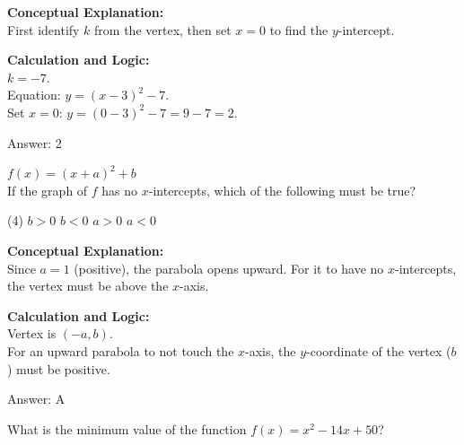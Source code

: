 \documentclass[11pt,paper=a4,answers]{exam}
\begin{document}
\begin{questions}
\begin{solution}
\textbf{Conceptual Explanation:} \\
First identify $k$ from the vertex, then set $x=0$ to find the $y$-intercept.

\vspace{20pt}

\textbf{Calculation and Logic:} \\
$k = -7$. \\
Equation: $y = (x-3)^2 - 7$. \\
Set $x = 0$: $y = (0-3)^2 - 7 = 9 - 7 = 2$.

\vspace{25pt}

Answer: \colorbox{yellow!100}{2}
\end{solution}

\vspace{40pt}

\question
$f(x) = (x+a)^2 + b$ \\
If the graph of $f$ has no $x$-intercepts, which of the following must be true?
\begin{tasks}(4)
    \task $b > 0$
    \task $b < 0$
    \task $a > 0$
    \task $a < 0$
\end{tasks}

\begin{solution}
\textbf{Conceptual Explanation:} \\
Since $a=1$ (positive), the parabola opens upward. For it to have no $x$-intercepts, the vertex must be above the $x$-axis.

\vspace{20pt}

\textbf{Calculation and Logic:} \\
Vertex is $(-a, b)$. \\
For an upward parabola to not touch the $x$-axis, the $y$-coordinate of the vertex ($b$) must be positive.

\vspace{25pt}

Answer: \colorbox{yellow!100}{A}
\end{solution}

\vspace{40pt}

\question
What is the minimum value of the function $f(x) = x^2 - 14x + 50$?


\end{questions}
\end{document}
